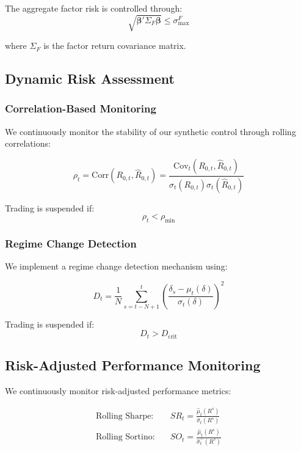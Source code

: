 The aggregate factor risk is controlled through:
\begin{equation}
    \sqrt{\boldsymbol{\beta}'\Sigma_F\boldsymbol{\beta}} \leq \sigma_{\text{max}}^F
\end{equation}

where $\Sigma_F$ is the factor return covariance matrix.

\subsection{Dynamic Risk Assessment}

\subsubsection{Correlation-Based Monitoring}
We continuously monitor the stability of our synthetic control through rolling correlations:

\begin{equation}
    \rho_t = \text{Corr}(R_{0,t}, \hat{R}_{0,t}) = \frac{\text{Cov}_t(R_{0,t}, \hat{R}_{0,t})}{\sigma_t(R_{0,t})\sigma_t(\hat{R}_{0,t})}
\end{equation}

Trading is suspended if:
\begin{equation}
    \rho_t < \rho_{\text{min}}
\end{equation}

\subsubsection{Regime Change Detection}
We implement a regime change detection mechanism using:

\begin{equation}
    D_t = \frac{1}{N}\sum_{s=t-N+1}^t \left(\frac{\delta_s - \mu_t(\delta)}{\sigma_t(\delta)}\right)^2
\end{equation}

Trading is suspended if:
\begin{equation}
    D_t > D_{\text{crit}}
\end{equation}

\subsection{Risk-Adjusted Performance Monitoring}

We continuously monitor risk-adjusted performance metrics:

\begin{equation}
\begin{aligned}
    \text{Rolling Sharpe:} \quad & SR_t = \frac{\hat{\mu}_t(R^s)}{\hat{\sigma}_t(R^s)} \\
    \text{Rolling Sortino:} \quad & SO_t = \frac{\hat{\mu}_t(R^s)}{\hat{\sigma}_t^-(R^s)}
\end{aligned}
\end{equation}

